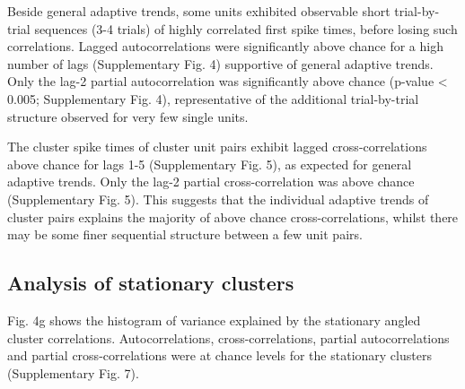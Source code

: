 \documentclass{article}
\begin{document}
Beside general adaptive trends, some units exhibited observable short trial-by-trial sequences (3-4 trials) of highly correlated first spike times, before losing such correlations. Lagged autocorrelations were significantly above chance for a high number of lags (Supplementary Fig. 4) supportive of general adaptive trends. Only the lag-2 partial autocorrelation was significantly above chance (p-value < 0.005; Supplementary Fig. 4), representative of the additional trial-by-trial structure observed for very few single units.

The cluster spike times of cluster unit pairs exhibit lagged cross-correlations above chance for lags 1-5 (Supplementary Fig. 5), as expected for general adaptive trends. Only the lag-2 partial cross-correlation was above chance (Supplementary Fig. 5). This suggests that the individual adaptive trends of cluster pairs explains the majority of above chance cross-correlations, whilst there may be some finer sequential structure between a few unit pairs. 





\subsection*{Analysis of stationary clusters}
Fig. 4g shows the histogram of variance explained by the stationary angled cluster correlations. Autocorrelations, cross-correlations, partial autocorrelations and partial cross-correlations were at chance levels for the stationary clusters (Supplementary Fig. 7).
\end{document}
